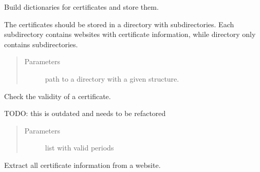 \documentclass[letterpaper,10pt,english]{sphinxmanual}
\begin{document}
\begin{fulllineitems}
\begin{fulllineitems}
\end{fulllineitems}


\begin{fulllineitems}
\label{\detokenize{api:bioc.BiocStore.build_dict}}
Build dictionaries for certificates and store them.

The certificates should be stored in a directory with
subdirectories. Each subdirectory contains websites with
certificate information, while directory only contains
subdirectories.
\begin{quote}\begin{description}
\item[{Parameters}] \leavevmode
{} \textendash{} path to a directory with a given structure.

\end{description}\end{quote}

\end{fulllineitems}


\begin{fulllineitems}
\label{\detokenize{api:bioc.BiocStore.check_validity}}
Check the validity of a certificate.

TODO: this is outdated and needs to be refactored
\begin{quote}\begin{description}
\item[{Parameters}] \leavevmode
{} \textendash{} list with valid periods

\end{description}\end{quote}

\end{fulllineitems}


\begin{fulllineitems}
\label{\detokenize{api:bioc.BiocStore.extract_all}}
Extract all certificate information from a website.


\end{fulllineitems}
\end{fulllineitems}
\end{document}
